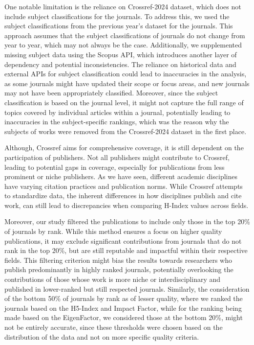 One notable limitation is the reliance on Crossref-2024 dataset, which does not
include subject classifications for the journals. To address this, we used the
subject classifications from the previous year’s dataset for the journals. This
approach assumes that the subject classifications of journals do not change
from year to year, which may not always be the case. Additionally, we
supplemented missing subject data using the Scopus API, which introduces
another layer of dependency and potential inconsistencies. The reliance on
historical data and external APIs for subject classification could lead to
inaccuracies in the analysis, as some journals might have updated their scope
or focus areas, and new journals may not have been appropriately classified.
Moreover, since the subject classification is based on the journal level, it
might not capture the full range of topics covered by individual articles within
a journal, potentially leading to inaccuracies in the subject-specific
rankings, which was the reason why the subjects of works were removed from the
Crossref-2024 dataset in the first place.

Although, Crossref aims for comprehensive coverage, it is still dependent on
the participation of publishers. Not all publishers might contribute to
Crossref, leading to potential gaps in coverage, especially for publications
from less prominent or niche publishers. As we have seen, different academic
disciplines have varying citation practices and publication norms. While
Crossref attempts to standardize data, the inherent differences in how
disciplines publish and cite work, can still lead to discrepancies when
comparing H-Index values across fields.

Moreover, our study filtered the publications to include only those in the top
20\% of journals by rank. While this method ensures a focus on higher
quality publications, it may exclude significant contributions from journals
that do not rank in the top 20\%, but are still reputable and impactful within
their respective fields. This filtering criterion might bias the results
towards researchers who publish predominantly in highly ranked journals,
potentially overlooking the contributions of those whose work is more niche or
interdisciplinary and published in lower-ranked but still respected journals.
Similarly, the consideration of the bottom 50\% of journals by rank as of
lesser quality, where we ranked the journals based on the H5-Index and Impact
Factor, while for the ranking being made based on the EigenFactor, we
considered those at the bottom 20\%, might not be entirely accurate, since
these thresholds were chosen based on the distribution of the data and not on
more specific quality criteria.

